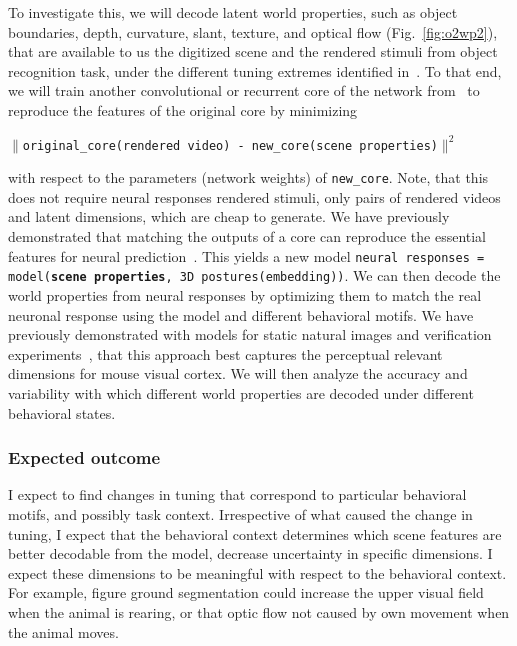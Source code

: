 \documentclass[B2,COG]{ercgrant}
\begin{document}
To investigate this, we will decode latent world properties, such as object boundaries, depth, curvature, slant, texture, and optical flow (Fig.~\ref{fig:o2wp2}), that are available to us the digitized scene and the rendered stimuli from object recognition task, under the different tuning extremes identified in~.
To that end, we will train another convolutional or recurrent core of the network from~ to reproduce the features of the original core by minimizing
\begin{center}
    \texttt{$\|$original\_core(rendered video) - new\_core(scene properties)$\|^2$}
\end{center}
with respect to the parameters (network weights) of \texttt{new\_core}. 
Note, that this does not require neural responses rendered stimuli, only pairs of rendered videos and latent dimensions, which are cheap to generate. 
We have previously demonstrated that matching the outputs of a core can reproduce the essential features for neural prediction~\parencite{Safarani2021-yy}.
This yields a new model \texttt{neural responses = model(\textbf{scene properties}, 3D postures(embedding))}.
We can then decode the world properties from neural responses by optimizing them to match the real neuronal response using the model and different behavioral motifs.
We have previously demonstrated with models for static natural images and verification experiments~\parencite{Cobos2022-rr}, that this approach best captures the perceptual relevant dimensions for mouse visual cortex. 
We will then analyze the accuracy and variability with which different world properties are decoded under different behavioral states. 

\subsubsection{Expected outcome} 
I expect to find changes in tuning that correspond to particular behavioral motifs, and possibly task context.
Irrespective of what caused the change in tuning, I expect that the behavioral context determines which scene features are better decodable from the model, \ie decrease uncertainty in specific dimensions.
I expect these dimensions to be meaningful with respect to the behavioral context. 
For example, figure ground segmentation could increase the upper visual field when the animal is rearing, or that optic flow not caused by own movement when the animal moves. 
\end{document}

